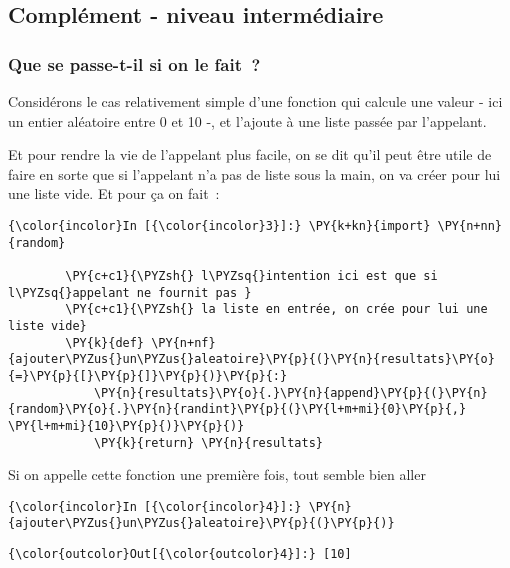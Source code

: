     \hypertarget{compluxe9ment---niveau-intermuxe9diaire}{%
\subsection{Complément - niveau
intermédiaire}\label{compluxe9ment---niveau-intermuxe9diaire}}

    \hypertarget{que-se-passe-t-il-si-on-le-fait}{%
\subsubsection{Que se passe-t-il si on le
fait~?}\label{que-se-passe-t-il-si-on-le-fait}}

    Considérons le cas relativement simple d'une fonction qui calcule une
valeur - ici un entier aléatoire entre 0 et 10 -, et l'ajoute à une
liste passée par l'appelant.

    Et pour rendre la vie de l'appelant plus facile, on se dit qu'il peut
être utile de faire en sorte que si l'appelant n'a pas de liste sous la
main, on va créer pour lui une liste vide. Et pour ça on fait~:

    \begin{Verbatim}[commandchars=\\\{\}]
{\color{incolor}In [{\color{incolor}3}]:} \PY{k+kn}{import} \PY{n+nn}{random}
        
        \PY{c+c1}{\PYZsh{} l\PYZsq{}intention ici est que si l\PYZsq{}appelant ne fournit pas }
        \PY{c+c1}{\PYZsh{} la liste en entrée, on crée pour lui une liste vide}
        \PY{k}{def} \PY{n+nf}{ajouter\PYZus{}un\PYZus{}aleatoire}\PY{p}{(}\PY{n}{resultats}\PY{o}{=}\PY{p}{[}\PY{p}{]}\PY{p}{)}\PY{p}{:}
            \PY{n}{resultats}\PY{o}{.}\PY{n}{append}\PY{p}{(}\PY{n}{random}\PY{o}{.}\PY{n}{randint}\PY{p}{(}\PY{l+m+mi}{0}\PY{p}{,} \PY{l+m+mi}{10}\PY{p}{)}\PY{p}{)}
            \PY{k}{return} \PY{n}{resultats}
\end{Verbatim}


    Si on appelle cette fonction une première fois, tout semble bien aller

    \begin{Verbatim}[commandchars=\\\{\}]
{\color{incolor}In [{\color{incolor}4}]:} \PY{n}{ajouter\PYZus{}un\PYZus{}aleatoire}\PY{p}{(}\PY{p}{)}
\end{Verbatim}


\begin{Verbatim}[commandchars=\\\{\}]
{\color{outcolor}Out[{\color{outcolor}4}]:} [10]
\end{Verbatim}
            
